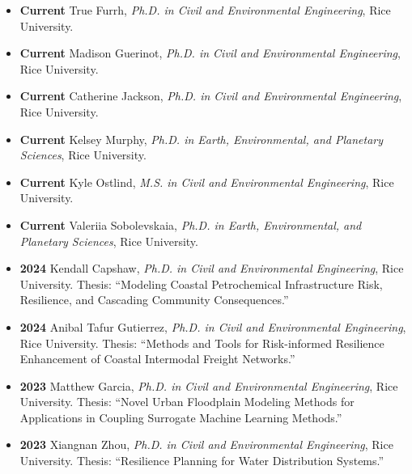 \documentclass[10pt,oneside]{article}
\begin{document}
\mbox{}\vspace{-\dimexpr\baselineskip\relax}

\begin{itemize}[label={}]


  \item \textbf{Current} True Furrh, \textit{Ph.D. in Civil and Environmental Engineering}, Rice University.

  \item \textbf{Current} Madison Guerinot, \textit{Ph.D. in Civil and Environmental Engineering}, Rice University.

  \item \textbf{Current} Catherine Jackson, \textit{Ph.D. in Civil and Environmental Engineering}, Rice University.

  \item \textbf{Current} Kelsey Murphy, \textit{Ph.D. in Earth, Environmental, and Planetary Sciences}, Rice University.

  \item \textbf{Current} Kyle Ostlind, \textit{M.S. in Civil and Environmental Engineering}, Rice University.

  \item \textbf{Current} Valeriia Sobolevskaia, \textit{Ph.D. in Earth, Environmental, and Planetary Sciences}, Rice University.



  \item \textbf{2024} \quad Kendall Capshaw, \textit{Ph.D. in Civil and Environmental Engineering}, Rice University. Thesis: \enquote{Modeling Coastal Petrochemical Infrastructure Risk, Resilience, and Cascading Community Consequences.}

  \item \textbf{2024} \quad Anibal Tafur Gutierrez, \textit{Ph.D. in Civil and Environmental Engineering}, Rice University. Thesis: \enquote{Methods and Tools for Risk-informed Resilience Enhancement of Coastal Intermodal Freight Networks.}

  \item \textbf{2023} \quad Matthew Garcia, \textit{Ph.D. in Civil and Environmental Engineering}, Rice University. Thesis: \enquote{Novel Urban Floodplain Modeling Methods for Applications in Coupling Surrogate Machine Learning Methods.}

  \item \textbf{2023} \quad Xiangnan Zhou, \textit{Ph.D. in Civil and Environmental Engineering}, Rice University. Thesis: \enquote{Resilience Planning for Water Distribution Systems.}


\end{itemize}
\end{document}
